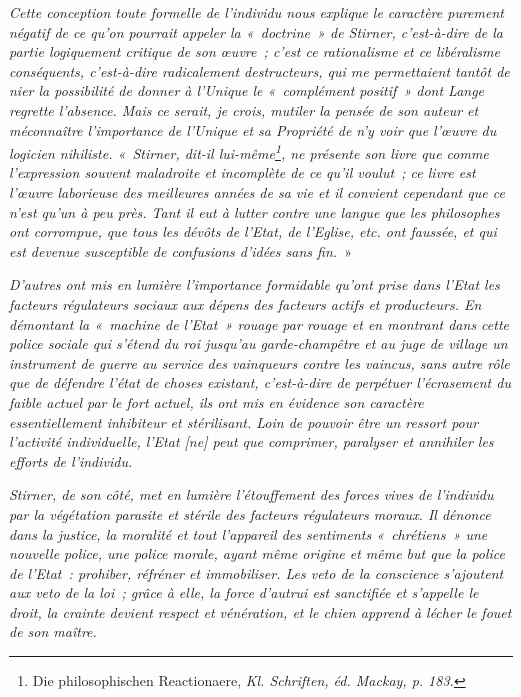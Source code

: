 \documentclass[french,twoside]{book} %
\newcommand\corr[1]{#1}
\begin{document}
\emph{Cette conception toute formelle de l’individu nous explique le caractère purement négatif de ce qu’on pourrait appeler la « doctrine » de Stirner, c’est-à-dire de la partie logiquement critique de son œuvre ; c’est ce rationalisme et ce libéralisme conséquents, c’est-à-dire radicalement destructeurs, qui me permettaient tantôt de nier la possibilité de donner à l’Unique le « complément positif » dont Lange regrette l’absence. Mais ce serait, je crois, mutiler la pensée de son auteur et méconnaître l’importance de l’\emph{Unique et sa Propriété} de n’y voir que l’œuvre du logicien nihiliste. « Stirner, dit-il lui-même\footnote{ \noindent Die philosophischen Reactionaere, \emph{Kl. Schriften, éd. Mackay, p. 183.}
 }, ne présente son livre que comme l’expression souvent maladroite et incomplète de ce qu’il voulut ; ce livre est l’œuvre laborieuse des meilleures années de sa vie et il convient cependant que ce n’est qu’un à peu près. Tant il eut à lutter contre une langue que les philosophes ont corrompue, que tous les dévôts de l’Etat, de l’Eglise, etc. ont faussée, et qui est devenue susceptible de confusions d’idées sans fin.} »\par
\emph{D’autres ont mis en lumière l’importance formidable qu’ont prise dans l’Etat les \emph{facteurs régulateurs sociaux} aux dépens des facteurs actifs et producteurs. En démontant la « machine de l’Etat » rouage par rouage et en montrant dans cette police sociale qui s’étend du roi jusqu’au garde-champêtre et au juge de village un instrument de guerre au service des vainqueurs contre les vaincus, sans autre rôle que de défendre l’état de choses existant, c’est-à-dire  de perpétuer l’écrasement du faible actuel par le fort actuel, ils ont mis en évidence son caractère essentiellement inhibiteur et stérilisant. Loin de pouvoir être un ressort pour l’activité individuelle, l’Etat [{\corr ne}] peut que comprimer, paralyser et annihiler les efforts de l’individu.}\par
\emph{Stirner, de son côté, met en lumière l’étouffement des forces vives de l’individu par la végétation parasite et stérile des facteurs régulateurs moraux. Il dénonce dans la justice, la moralité et tout l’appareil des sentiments « chrétiens » une nouvelle police, une police morale, ayant même origine et même but que la police de l’Etat : prohiber, réfréner et immobiliser. Les veto de la conscience s’ajoutent aux veto de la loi ; grâce à elle, la force d’autrui est sanctifiée et s’appelle le droit, la crainte devient respect et vénération, et le chien apprend à lécher le fouet de son maître.}\par
\end{document}
